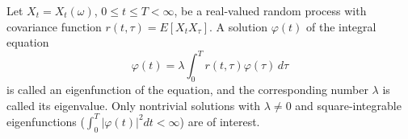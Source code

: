 Let $X_t = X_t(\omega)$, $0 \leq t \leq T < \infty$, be a real-valued random process with covariance function $r(t,\tau) = E[X_t X_\tau]$. A solution $\varphi(t)$ of the integral equation
$$\varphi(t) = \lambda \int_0^T r(t,\tau) \varphi(\tau) \, d\tau$$
is called an eigenfunction of the equation, and the corresponding number $\lambda$ is called its eigenvalue. Only nontrivial solutions with $\lambda \neq 0$ and square-integrable eigenfunctions ($\int_0^T |\varphi(t)|^2 dt < \infty$) are of interest.
